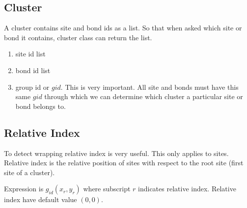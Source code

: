 	\subsection{Cluster}
	A cluster contains site and bond ids as a list. So that when asked which site or bond it contains, cluster class can return the list.
	\begin{enumerate}
		\item site id list
		\item bond id list
		\item group id or $gid$. This is very important. All site and bonds must have this same $gid$ through which we can determine which cluster a particular site or bond belongs to.
	\end{enumerate}

	\subsection{Relative Index}
	To detect wrapping relative index is very useful. This only applies to sites. Relative index is the relative position of sites with respect to the root site (first site of a cluster).
	
	
	Expression is $g_{id} (x_r,y_r)$ where subscript $r$ indicates relative index. Relative index have default value $(0,0)$.
	
